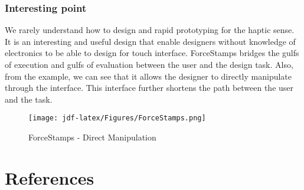 \documentclass[
	letterpaper, %
]{jdf}
\begin{document}
\subsubsection{Interesting point}
We rarely understand how to design and rapid prototyping for the haptic sense. It is an interesting and useful design that enable designers without knowledge of electronics to be able to design for touch interface. ForceStamps bridges the gulfs of execution and gulfs of evaluation between the user and the design task. Also, from the example, we can see that it allows the designer to directly manipulate through the interface. This interface further shortens the path between the user and the task.

\begin{figure}[h]
	\centering
	\texttt{[image: jdf-latex/Figures/ForceStamps.png]}
	\caption{ForceStamps - Direct Manipulation}
	\label{fig:forcestamp}
\end{figure}

\section{References}
\printbibliography[heading=none]
\end{document}
